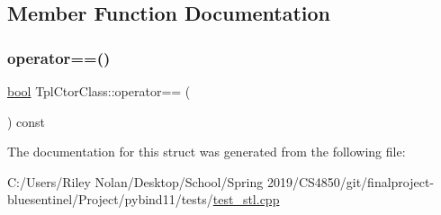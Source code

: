 \subsection{Member Function Documentation}
\mbox{\label{struct_tpl_ctor_class_a524daa08d02c8b8fa13c0ec0c7592f66}} 
\subsubsection{\texorpdfstring{operator==()}{operator==()}}
{\footnotesize\ttfamily \mbox{\hyperlink{asdl_8h_af6a258d8f3ee5206d682d799316314b1}{bool}} Tpl\+Ctor\+Class\+::operator== (\begin{DoxyParamCaption}\item[{const \mbox{\hyperlink{struct_tpl_ctor_class}{Tpl\+Ctor\+Class}} \&}]{ }\end{DoxyParamCaption}) const\hspace{0.3cm}{\ttfamily [inline]}}



The documentation for this struct was generated from the following file\+:\begin{DoxyCompactItemize}
\item 
C\+:/\+Users/\+Riley Nolan/\+Desktop/\+School/\+Spring 2019/\+C\+S4850/git/finalproject-\/bluesentinel/\+Project/pybind11/tests/\mbox{\hyperlink{test__stl_8cpp}{test\+\_\+stl.\+cpp}}\end{DoxyCompactItemize}
